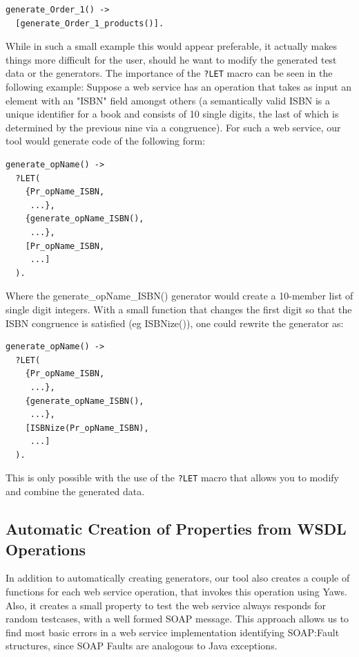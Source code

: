 \documentclass[submission,copyright,a4]{eptcs}
\newcommand{\LET}{\texttt{?LET}\xspace}
\begin{document}
\begin{lstlisting}
generate_Order_1() ->
  [generate_Order_1_products()].
\end{lstlisting}

While in such a small example this would appear preferable, it actually makes things more 
difficult for the user, should he want to modify the generated test data or the generators. 
The importance of the \LET macro can be seen in the following example: Suppose a web service 
has an operation that takes as input an element with an "ISBN" field amongst others (a 
semantically valid ISBN is a unique identifier for a book and consists of 10 single digits, 
the last of which is determined by the previous nine via a congruence). For such a web service, 
our tool would generate code of the following form:

\begin{lstlisting}
generate_opName() ->
  ?LET(
    {Pr_opName_ISBN,
     ...},
    {generate_opName_ISBN(),
     ...},
    [Pr_opName_ISBN,
     ...]
  ).
\end{lstlisting}

Where the generate\_opName\_ISBN() generator would create a 10-member list of single digit integers. 
With a small function that changes the first digit so that the ISBN congruence is satisfied 
(eg ISBNize()), one could rewrite the generator as:

\begin{lstlisting}
generate_opName() ->
  ?LET(
    {Pr_opName_ISBN,
     ...},
    {generate_opName_ISBN(),
     ...},
    [ISBNize(Pr_opName_ISBN),
     ...]
  ).
\end{lstlisting}

This is only possible with the use of the \LET macro that allows you to modify and combine the 
generated data. 

\subsection{Automatic Creation of Properties from WSDL Operations}

In addition to automatically creating generators, our tool also creates a couple of functions 
for each web service operation, that invokes this operation using Yaws. Also, it creates a 
small property to test the web service always responds for random testcases, with a well 
formed SOAP message. This approach allows us to find most basic errors in a web service 
implementation identifying SOAP:Fault structures, since SOAP Faults are analogous to Java 
exceptions. 
\end{document}
